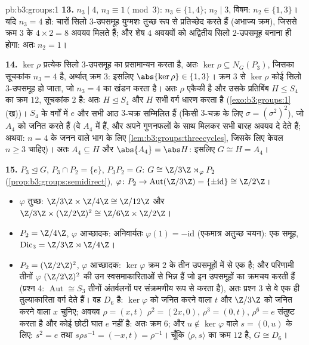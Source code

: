 \begin{solution}{pb:b3:groups:1}
\textbf{13.} $n_3 \mid 4$, $n_3 \equiv 1 \pmod 3$: $n_3 \in \{1,
4\}$; $n_2 \mid 3$, विषम: $n_2 \in \{1, 3\}$। यदि $n_3 = 4$
हो: चारों सिलो $3$-उपसमूह युग्मशः तुच्छ रूप से प्रतिच्छेद करते
हैं (अभाज्य क्रम), जिससे क्रम $3$ के $4 \times 2 = 8$ अवयव मिलते हैं; और शेष
$4$ अवयवों को अद्वितीय सिलो $2$-उपसमूह बनाना ही होगा: अतः $n_2 = 1$।

\textbf{14.} $\ker\rho$ प्रत्येक सिलो $3$-उपसमूह का प्रसामान्यन करता
है, अतः $\ker \rho \subseteq N_G(P_3)$, जिसका सूचकांक $n_3 = 4$ है, अर्थात् क्रम $3$: इसलिए
$\abs{\ker\rho} \in \{1, 3\}$। क्रम $3$ से $\ker\rho$ कोई \emph{} सिलो $3$-उपसमूह
हो जाता, जो $n_3
= 4$ का खंडन करता है। अतः $\rho$ एकैकी है और उसके
प्रतिबिंब $H \leq S_4$ का क्रम $12$, सूचकांक $2$ है: अतः $H \trianglelefteq S_4$ और $H$
सभी वर्ग धारण करता है (\cref{exo:b3:groups:1}(ख))। $S_4$ के वर्गों में $e$ और सभी
आठ $3$-चक्र सम्मिलित हैं (किसी $3$-चक्र के लिए $\sigma = (\sigma^2)^2$), जो $A_4$
को जनित करते हैं (वे $A_4$ में हैं, और अपने गुणनफलों के साथ मिलकर
सभी बारह अवयव दे देते हैं; अथवा: $n = 4$ के जनन वाले भाग के लिए \cref{lem:b3:groups:threecycles},
जिसके लिए केवल $n \geq 3$ चाहिए)। अतः $A_4 \subseteq H$ और $\abs{A_4}
= \abs H$: इसलिए $G \cong H = A_4$।

\textbf{15.} $P_3 \trianglelefteq G$, $P_3 \cap P_2 = \{e\}$, $P_3P_2 = G$: $G \cong \Z/3\Z \rtimes_\varphi P_2$ (\cref{prop:b3:groups:semidirect}), $\varphi \colon P_2 \to
\operatorname{Aut}(\Z/3\Z) = \{\pm\mathrm{id}\} \cong \Z/2\Z$।
\begin{itemize}
  \item $\varphi$ तुच्छ:  $\Z/3\Z \times \Z/4\Z
        \cong \Z/12\Z$ और $\Z/3\Z \times (\Z/2\Z)^2 \cong \Z/6\Z
        \times \Z/2\Z$।
  \item $P_2 = \Z/4\Z$, $\varphi$ आच्छादक: अनिवार्यतः $\varphi(1) = -\mathrm{id}$ (एकमात्र अतुच्छ
        चयन): एक समूह, $\mathrm{Dic}_3 = \Z/3\Z \rtimes \Z/4\Z$।
  \item $P_2 = (\Z/2\Z)^2$, $\varphi$ आच्छादक: $\ker\varphi$ क्रम $2$ के तीन उपसमूहों में
        से एक है; और परिणामी तीनों $\varphi$ $(\Z/2\Z)^2$ की उन स्वसमाकारिताओं
        से भिन्न हैं जो इन उपसमूहों का क्रमचय करती हैं (प्रश्न 4:
        $\operatorname{Aut}
        \cong S_3$ तीनों अंतर्वलनों पर संक्रमणीय रूप से  करता है),
        अतः प्रश्न 3 से वे एक ही तुल्याकारिता वर्ग देते हैं। वह
        $D_6$ है: $\ker\varphi$ को जनित करने वाला $t$ और $\Z/3\Z$ को जनित
        करने वाला $x$ चुनिए; अवयव $\rho = (x, t)$ $\rho^2 = (2x, 0)$, $\rho^3 = (0, t)$, $\rho^6 = e$
        संतुष्ट करता है और कोई छोटी घात $e$ नहीं है: अतः क्रम
        $6$; और $u
        \notin \ker\varphi$ वाले $s = (0, u)$ के लिए: $s^2 = e$ तथा $s\rho s^{-1} = (-x, t)
        = \rho^{-1}$। चूँकि
        $\langle \rho, s\rangle$ का क्रम $12$ है, $G \cong D_6$।
\end{itemize}


\end{solution}
